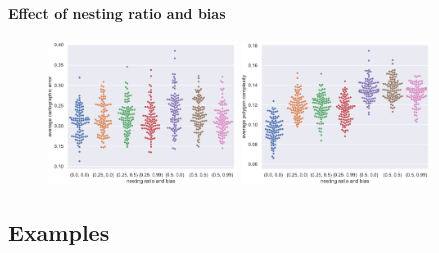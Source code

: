 \documentclass[t,18pt]{beamer}
\begin{document}
\begin{frame}[c]
  \frametitle{}
  \framesubtitle{Effect of nesting ratio and bias}
  \begin{figure}
    \includegraphics[width=5cm]{../Thesis/Resources/Evaluation-AverageCartographicError-ab.pdf}
    \quad
    \includegraphics[width=5cm]{../Thesis/Resources/Evaluation-AveragePolygonComplexity-ab.pdf}
  \end{figure}
\end{frame}

\subsection{Examples}
\label{subsect:examples}
\end{document}
